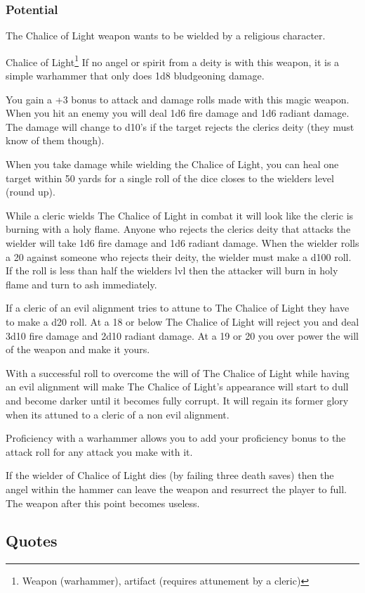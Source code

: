 \documentclass[letterpaper,10pt,twoside,twocolumn,openany]{book}
\begin{document}
\subsubsection{Potential}

The Chalice of Light weapon wants to be wielded by a religious character. 

\begin{commentbox}{Chalice of Light\footnote{Weapon (warhammer), artifact (requires attunement by a cleric)}}	
	If no angel or spirit from a deity is with this weapon, it is a simple warhammer that only does 1d8 bludgeoning damage.
	
	You gain a +3 bonus to attack and damage rolls made with this magic weapon. When you hit an enemy you will deal 1d6 fire damage and 1d6 radiant damage. The damage will change to d10's if the target rejects the clerics deity (they must know of them though).
	
	When you take damage while wielding the Chalice of Light, you can heal one target within 50 yards for a single roll of the dice closes to the wielders level (round up).
	
	While a cleric wields The Chalice of Light in combat it will look like the cleric is burning with a holy flame. Anyone who rejects the clerics deity that attacks the wielder will take 1d6 fire damage and 1d6 radiant damage. When the wielder rolls a 20 against someone who rejects their deity, the wielder must make a d100 roll. If the roll is less than half the wielders lvl then the attacker will burn in holy flame and turn to ash immediately.
	
	If a cleric of an evil alignment tries to attune to The Chalice of Light they have to make a d20 roll. At a 18 or below The Chalice of Light will reject you and deal 3d10 fire damage and 2d10 radiant damage. At a 19 or 20 you over power the will of the weapon and make it yours.
	
	With a successful roll to overcome the will of The Chalice of Light while having an evil alignment will make The Chalice of Light's appearance will start to dull and become darker until it becomes fully corrupt. It will regain its former glory when its attuned to a cleric of a non evil alignment.
	
	Proficiency with a warhammer allows you to add your proficiency bonus to the attack roll for any attack you make with it.
	
	If the wielder of Chalice of Light dies (by failing three death saves) then the angel within the hammer can leave the weapon and resurrect the player to full. The weapon after this point becomes useless.
\end{commentbox}

\subsection{Quotes}

\end{document}
